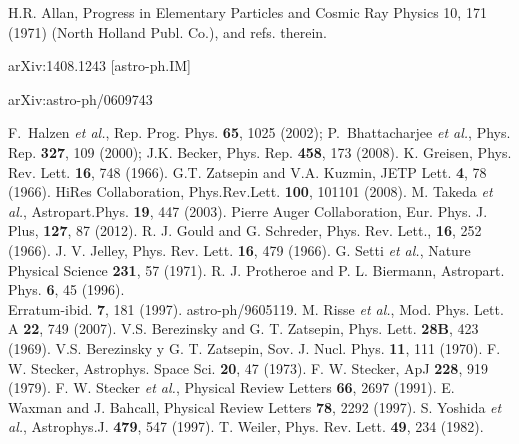 \begin{thebibliography}{1}
 H.R. Allan, Progress in Elementary Particles and Cosmic Ray Physics 10, 171 (1971) (North Holland Publ. Co.), and refs. therein.

 arXiv:1408.1243 [astro-ph.IM]

 arXiv:astro-ph/0609743

F.~Halzen {\it et al.}, Rep. Prog. Phys. {\bf 65}, 1025 (2002);\newline
P.~Bhattacharjee {\it et al.}, Phys. Rep. {\bf 327}, 109 (2000);\newline
J.K. Becker, Phys. Rep. {\bf 458}, 173 (2008). 
 K. Greisen, Phys. Rev. Lett. \textbf{16}, 748 (1966).
 G.T. Zatsepin and V.A. Kuzmin, JETP Lett. \textbf{4}, 78 (1966).
 HiRes Collaboration, Phys.Rev.Lett. \textbf{100}, 101101 (2008).
  M. Takeda {\it et al.}, Astropart.Phys. \textbf{19}, 447 (2003).
 Pierre Auger Collaboration, Eur. Phys. J. Plus, \textbf{127}, 87 (2012).
 R. J. Gould and G. Schreder, Phys. Rev. Lett., \textbf{16}, 252 (1966).
  J. V. Jelley, Phys. Rev. Lett. \textbf{16}, 479 (1966).
 G. Setti {\it et al.}, Nature Physical Science \textbf{231}, 57 (1971).
 R. J. Protheroe and P. L. Biermann, Astropart. Phys. \textbf{6}, 45 (1996).\\
Erratum-ibid. \textbf{7}, 181 (1997). astro-ph/9605119.
 M. Risse {\it et al.}, Mod. Phys. Lett. A \textbf{22}, 749 (2007).
 V.S. Berezinsky and G. T. Zatsepin, Phys. Lett. {\bf 28B}, 423 (1969).\newline
V.S. Berezinsky y G. T. Zatsepin, Sov. J. Nucl. Phys. {\bf 11}, 111 (1970).
 F. W. Stecker, Astrophys. Space Sci. {\bf 20}, 47 (1973).\newline
F. W. Stecker, ApJ {\bf 228}, 919 (1979).
 F. W. Stecker  {\it et al.}, Physical Review Letters \textbf{66}, 2697 (1991).
 E. Waxman and J. Bahcall,  Physical Review Letters \textbf{78}, 2292 (1997).
 S. Yoshida {\it et al.}, Astrophys.J. \textbf{479}, 547 (1997).
 T. Weiler,  Phys. Rev. Lett. \textbf{49}, 234 (1982).

\end{thebibliography}
